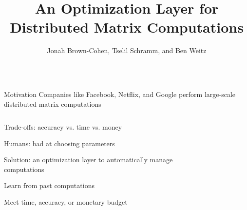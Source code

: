 \documentclass[final]{beamer}
\title[]{{\veryHuge An Optimization Layer for Distributed Matrix Computations }}
\author[]{{\Large Jonah Brown-Cohen, Tselil Schramm, and Ben Weitz}}
\date{}
\begin{document}
{\large
  \begin{frame}{} 

\maketitle

\vspace{-1cm}
\begin{center}
\begin{columns}[t]
\begin{column}{0.32\textwidth}


    \begin{block}{\huge Motivation}
\vspace{.5cm}
{\Large Companies like Facebook, Netflix, and Google perform large-scale distributed matrix computations}
\begin{columns}[t]
\begin{column}{0.45\textwidth}
\begin{itemize} {\Large
\item Trade-offs: accuracy vs. time vs. money
\item Humans: bad at choosing parameters
\item Solution: an optimization layer to automatically manage computations
\item Learn from past computations
\item Meet time, accuracy, or monetary budget
}
\end{itemize}
\end{column}
\begin{column}{0.45\textwidth}
\begin{center}
\begin{figure}
\end{figure}
\end{center}
\end{column}
\end{columns}
\end{block}
\end{column}
\end{columns}
\end{center}
\end{frame}}
\end{document}
